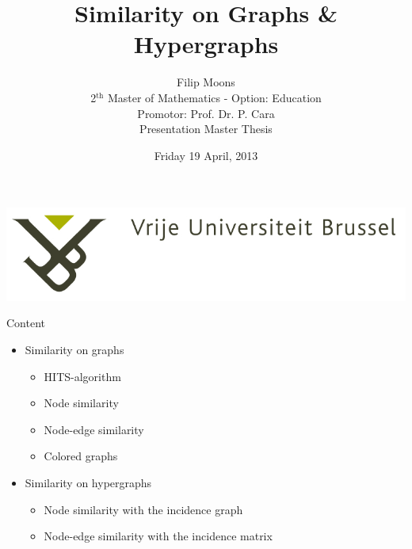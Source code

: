 \documentclass{beamer}
\title{Similarity on Graphs \& Hypergraphs}
\author{Filip Moons\\2$^{\text{th}}$ Master of Mathematics - Option: Education\\Promotor: Prof. Dr. P. Cara\\Presentation Master Thesis}
\date{Friday 19 April, 2013}
\begin{document}
\begin{frame}[plain]
\includegraphics[width=0.4\paperwidth]{VUB_logo.jpg}
\vspace{2cm}
\titlepage
\end{frame}



%
%
%
%

\begin{frame}{Content}
\begin{itemize}
  \item Similarity on graphs
    \begin{itemize}
        \item HITS-algorithm
        \item Node similarity
        \item Node-edge similarity
        \item Colored graphs
    \end{itemize}
  \item Similarity on hypergraphs
    \begin{itemize}
        \item Node similarity with the incidence graph
        \item Node-edge similarity with the incidence matrix
    \end{itemize}

\end{itemize}

\end{frame}
\end{document}
